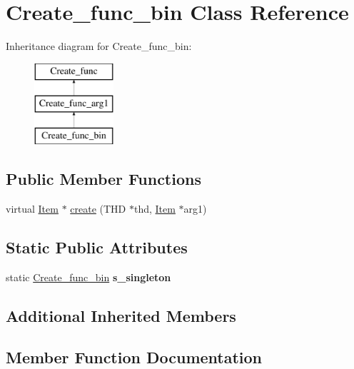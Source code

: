 \hypertarget{classCreate__func__bin}{}\section{Create\+\_\+func\+\_\+bin Class Reference}
\label{classCreate__func__bin}
Inheritance diagram for Create\+\_\+func\+\_\+bin\+:\begin{figure}[H]
\begin{center}
\leavevmode
\includegraphics[height=3.000000cm]{classCreate__func__bin}
\end{center}
\end{figure}
\subsection*{Public Member Functions}
\begin{DoxyCompactItemize}
\item 
virtual \mbox{\hyperlink{classItem}{Item}} $\ast$ \mbox{\hyperlink{classCreate__func__bin_a33db05f81f4a9e905f78901c4a082774}{create}} (T\+HD $\ast$thd, \mbox{\hyperlink{classItem}{Item}} $\ast$arg1)
\end{DoxyCompactItemize}
\subsection*{Static Public Attributes}
\begin{DoxyCompactItemize}
\item 
\mbox{\label{classCreate__func__bin_a79bb7716f519f3e577c77570e00a4c86}} 
static \mbox{\hyperlink{classCreate__func__bin}{Create\+\_\+func\+\_\+bin}} {\bfseries s\+\_\+singleton}
\end{DoxyCompactItemize}
\subsection*{Additional Inherited Members}


\subsection{Member Function Documentation}
\mbox{\label{classCreate__func__bin_a33db05f81f4a9e905f78901c4a082774}} 
